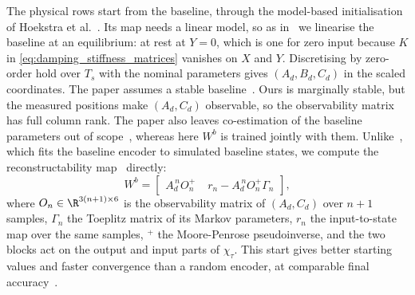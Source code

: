 The physical rows start from the baseline, through the model-based
initialisation of Hoekstra et al.~\cite[Sec.~3.1]{hoekstra2026encoder}.
Its map needs a linear model, so as in~\cite[Eqs.~(30) to (32)]{hoekstra2026encoder}
we linearise the baseline at an equilibrium: at rest at $Y=0$, which is one
for zero input because $K$ in \eqref{eq:damping_stiffness_matrices} vanishes
on $X$ and $Y$.
Discretising by zero-order hold over $T_s$ with the nominal parameters gives
$(A_d,B_d,C_d)$ in the scaled coordinates.
The paper assumes a stable baseline~\cite[Sec.~2]{hoekstra2026encoder}.
Ours is marginally stable, but the measured positions make $(A_d,C_d)$
observable, so the observability matrix has full column rank.
The paper also leaves co-estimation of the baseline parameters out of
scope~\cite[footnote~1]{hoekstra2026encoder}, whereas here $W^b$ is trained
jointly with them.
Unlike~\cite[Eq.~(30)]{hoekstra2026lfr}, which fits the baseline encoder to
simulated baseline states, we compute the reconstructability
map~\cite[Eqs.~(15) to (17)]{hoekstra2026encoder} directly:
\begin{equation}
 W^b=\begin{bmatrix}
  A_d^{\,n}O_n^{+} & \;r_n-A_d^{\,n}O_n^{+}\Gamma_n
 \end{bmatrix},
 \label{eq:aug_wb}
\end{equation}
where $O_n\in\R^{3(n+1)\times6}$ is the observability matrix of $(A_d,C_d)$
over $n+1$ samples, $\Gamma_n$ the Toeplitz matrix of its Markov parameters,
$r_n$ the input-to-state map over the same samples, ${}^{+}$ the Moore-Penrose
pseudoinverse, and the two blocks act on the output and input parts of
$\chi_\tau$.
This start gives better starting values and faster convergence than a random
encoder, at comparable final accuracy~\cite[Sec.~4.4]{hoekstra2026encoder}.

